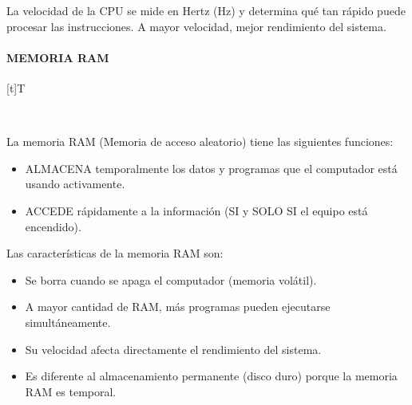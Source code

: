 \documentclass[letterpaper,10pt,spanish]{sphinxmanual}
\let\sphinxpxdimen\pdfpxdimen\else\newdimen\sphinxpxdimen
\begin{document}
\sphinxAtStartPar
La velocidad de la CPU se mide en Hertz (Hz) y determina qué tan rápido puede procesar las instrucciones. A mayor velocidad, mejor rendimiento del sistema.


\paragraph{MEMORIA RAM}
\label{\detokenize{1_guias/8logica/G821:memoria-ram}}

\begin{savenotes}\sphinxattablestart
\sphinxthistablewithglobalstyle
\centering
\begin{tabulary}{\linewidth}[t]{T}
\sphinxtoprule
\sphinxtableatstartofbodyhook

\begin{sphinxfigure-in-table}
\centering
\capstart
\noindent\sphinxincludegraphics[width=300\sphinxpxdimen]{{image0211}.png}
\label{\detokenize{1_guias/8logica/G821:id14}}\end{sphinxfigure-in-table}\relax
\\
\sphinxbottomrule
\end{tabulary}
\sphinxtableafterendhook\par
\sphinxattableend\end{savenotes}

\sphinxAtStartPar
\sphinxfootnotemark[1] La memoria RAM (Memoria de acceso aleatorio) tiene las siguientes funciones:
\begin{itemize}
\item {} 
\sphinxAtStartPar
ALMACENA temporalmente los datos y programas que el computador está usando activamente.

\item {} 
\sphinxAtStartPar
ACCEDE rápidamente a la información (SI y SOLO SI el equipo está encendido).

\end{itemize}

\sphinxAtStartPar
Las características de la memoria RAM son:
\begin{itemize}
\item {} 
\sphinxAtStartPar
Se borra cuando se apaga el computador (memoria volátil).

\item {} 
\sphinxAtStartPar
A mayor cantidad de RAM, más programas pueden ejecutarse simultáneamente.

\item {} 
\sphinxAtStartPar
Su velocidad afecta directamente el rendimiento del sistema.

\item {} 
\sphinxAtStartPar
Es diferente al almacenamiento permanente (disco duro) porque la memoria RAM es temporal.

\end{itemize}
\end{document}

